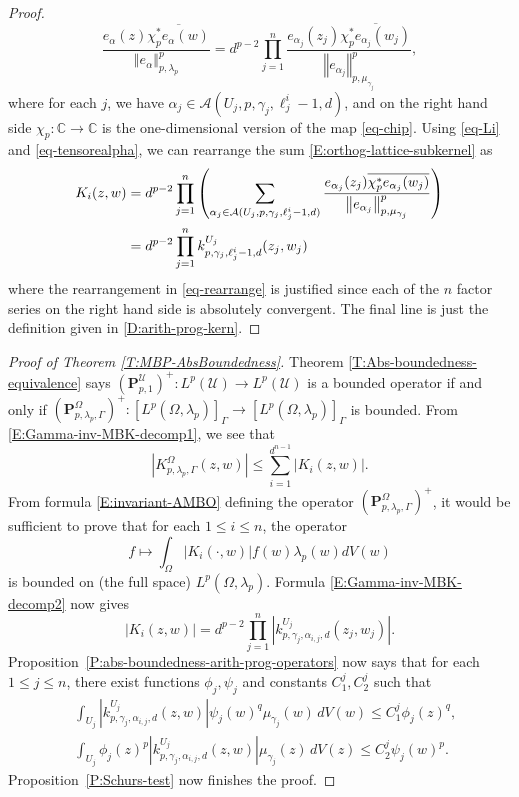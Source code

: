 \documentclass[letterpaper,11pt,reqno]{amsart}
\theoremstyle{plain}
\theoremstyle{definition}
\theoremstyle{remark}
\theoremstyle{remark}
\numberwithin{equation}{section}
\newcommand{\abs}[1]{\left\vert#1\right\vert}
\newcommand{\norm}[1]{\left\Vert#1\right\Vert}
\newcommand{\ol}{\overline}
\newcommand{\mugj}{{\mu_{\gamma_j}}}
\newcommand{\ca}{{\mathcal A}}
\newcommand{\cx}{{\mathbb C}}
\newcommand{\Uu}{\mathscr{U}}
\begin{document}
\begin{proof}
\begin{equation}\label{eq-tensorealpha}
\frac{e_\alpha(z) \ol{\chi_p^*e_\alpha(w)}} {\norm{e_\alpha}_{p,\lambda_p}^p} 
= d^{p-2} \prod_{j=1}^n \frac{e_{\alpha_j}(z_j) \ol{\chi_p^*e_{\alpha_j}(w_j)}} {\norm{e_{\alpha_j}}_{p,\mugj}^p},
\end{equation}
where for each $j$, we have $\alpha_j\in \ca(U_j,p,\gamma_j,\ell^{i}_j-1,d)$, and on the right hand side $\chi_p:\cx\to \cx$ is the one-dimensional version of the map \eqref{eq-chip}.
Using \eqref{eq-Li} and \eqref{eq-tensorealpha}, we can rearrange the sum \eqref{E:orthog-lattice-subkernel} as
\begin{align}
K_i(z,w) 
&= d^{p-2} \prod_{j=1}^n \left(\sum_{\alpha_j\in \ca(U_j,p,\gamma_j,\ell^{i}_j-1,d) }\frac{e_{\alpha_j}(z_j) \ol{\chi_p^*e_{\alpha_j}(w_j)}} {\norm{e_{\alpha_j}}_{p,\mugj}^p}\right) \label{eq-rearrange}\\
&= d^{p-2} \prod_{j=1}^n k^{U_j}_{p,\gamma_j,\ell^{i}_j-1,d}(z_j, w_j)\notag
\end{align}
where the rearrangement in \eqref{eq-rearrange} is justified since each of the $n$ factor series on the right hand side is absolutely convergent.
The final line is just the definition given in \eqref{D:arith-prog-kern}.
\end{proof}
\begin{proof}[Proof of Theorem \ref{T:MBP-AbsBoundedness}]
Theorem \ref{T:Abs-boundedness-equivalence} says $(\bm{P}^{\Uu}_{p,1})^+:L^p(\Uu) \to L^p(\Uu)$ is a bounded operator if and only if $(\bm{P}^{\Omega}_{p,\lambda_p,\Gamma})^+:[L^p(\Omega,\lambda_p)]_\Gamma \to [L^p(\Omega,\lambda_p)]_\Gamma$ is bounded.
From \eqref{E:Gamma-inv-MBK-decomp1}, we see that
\begin{equation}\label{E:bound-on-GammaInvMBP}
\abs{K_{p,\lambda_p,\Gamma}^{\Omega}(z,w)} \le \sum_{i=1}^{d^{n-1}} \abs{K_i(z,w)}.
\end{equation}
From formula \eqref{E:invariant-AMBO} defining the operator $(\bm{P}^{\Omega}_{p,\lambda_p,\Gamma})^+$, it would be sufficient to prove that for each $1 \leq i\leq n$, the operator
\[
f \mapsto \int_{\Omega} \abs{K_i(\cdot,w)} f(w) \lambda_p(w)dV(w)
\]
is bounded on (the full space) $L^p(\Omega,\lambda_p)$. 
Formula \eqref{E:Gamma-inv-MBK-decomp2} now gives
\[
\abs{K_i(z,w)} = d^{p-2} \prod_{j=1}^n \abs{k^{U_j}_{p,\gamma_j,\alpha_{i,j},d}(z_j,w_j)}.
\]
Proposition~\ref{P:abs-boundedness-arith-prog-operators} now says that for each $1\leq j \leq n$, there exist functions $\phi_j, \psi_j$ and constants $C_1^j, C_2^j$ such that 
\begin{align*}
&\int_{U_j} \abs{k^{U_j}_{p,\gamma_j,\alpha_{i,j},d}(z,w) } \psi_j(w)^q \mugj(w)\, dV(w) \le C^j_1 \phi_j(z)^q,  \\
&\int_{U_j} \phi_j(z)^p\abs{k^{U_j}_{p,\gamma_j,\alpha_{i,j},d}(z,w)}  \mugj(z)\, dV(z) \le C^j_2 \psi_j(w)^p.
\end{align*}
Proposition~\ref{P:Schurs-test} now finishes the proof.
\end{proof}
\end{document}
